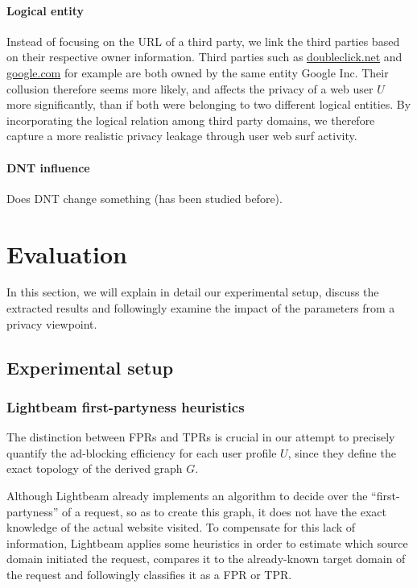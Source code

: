 \documentclass{sig-alternate}
\begin{document}
\paragraph{Logical entity}
\label{sec:logical_entity}
Instead of focusing on the URL of a third party, we link the third parties based on their respective owner information. Third parties such as \url{doubleclick.net} and \url{google.com} for example are both owned by the same entity Google Inc. Their collusion therefore seems more likely, and affects the privacy of a web user $U$ more significantly, than if both were belonging to two different logical entities. By incorporating the logical relation among third party domains, we therefore capture a more realistic privacy leakage through user web surf activity.

\paragraph{DNT influence}
Does DNT change something (has been studied before).

\section{Evaluation}
In this section, we will explain in detail our experimental setup, discuss the extracted results and followingly examine the impact of the parameters from a privacy viewpoint.

\subsection{Experimental setup}
\subsubsection{Lightbeam first-partyness heuristics}
The distinction between FPRs and TPRs is crucial in our attempt to precisely quantify the ad-blocking efficiency for each user profile $U$, since they define the exact topology of the derived graph $G$.

Although Lightbeam already implements an algorithm to decide over the ``first-partyness'' of a request, so as to create this graph, it does not have the exact knowledge of the actual website visited. To compensate for this lack of information, Lightbeam applies some heuristics in order to estimate which source domain initiated the request, compares it to the already-known target domain of the request and followingly classifies it as a FPR or TPR.
\end{document}
